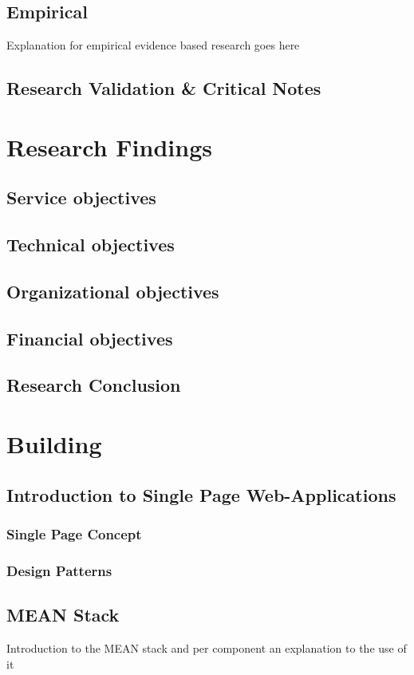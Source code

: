 \documentclass[15pt]{article}
\begin{document}
    \subsection{Empirical}
    Explanation for empirical evidence based research goes here
    \subsection{Research Validation \& Critical Notes}
    
    
\section{Research Findings}
	\subsection{Service objectives}
    \subsection{Technical objectives}
    \subsection{Organizational objectives}
    \subsection{Financial objectives}
	\subsection{Research Conclusion}
	
\section{Building}
	\subsection{Introduction to Single Page Web-Applications}
		\subsubsection{Single Page Concept}
		\subsubsection{Design Patterns}
	\subsection{MEAN Stack}
		Introduction to the MEAN stack and per component an explanation to the use of it
\end{document}
